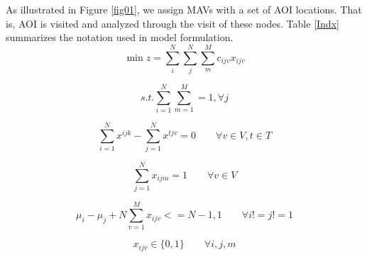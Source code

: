 \documentclass[preprint,review, 11pt,3p,authoryear]{elsarticle}
\begin{document}
{As illustrated in Figure \ref{fig01}, we assign MAVs with a set of AOI locations. That is, AOI is visited and analyzed through the visit of these nodes. Table \ref{Indx} summarizes the notation used in model formulation. \\









\begin{equation}
\label{eq01}
\min z = \sum_{i}^{N} \sum_{j}^{N} \sum_{m}^{M}  c_{ijv} x_{ijv} 
\end{equation}



\begin{equation}
\label{eq02}
s.t. \sum_{i=1}^{N} \sum_{m=1}^{M} =1, \forall j
\end{equation}



\begin{equation}
\label{eq03}
\sum_{i=1}^{N} x^{ijk} - \sum_{j=1}^{N} x^{tjv} =0 \qquad \forall v \in V, t \in T
\end{equation}



\begin{equation}
\label{eq04}
\sum_{j=1}^{N} x_{ijm} = 1 \qquad \forall  v  \in V 
\end{equation}



\begin{equation}
\label{eq05}
\mu_i - \mu_j + N \sum_{v=1}^M x_{ijv} <= N-1,  1 \qquad \forall i != j !=1
\end{equation}

\begin{equation}
\label{eq06}
 x_{ijv} \in \{0,1\} \qquad  \forall i,j,m
\end{equation}



}
\end{document}
